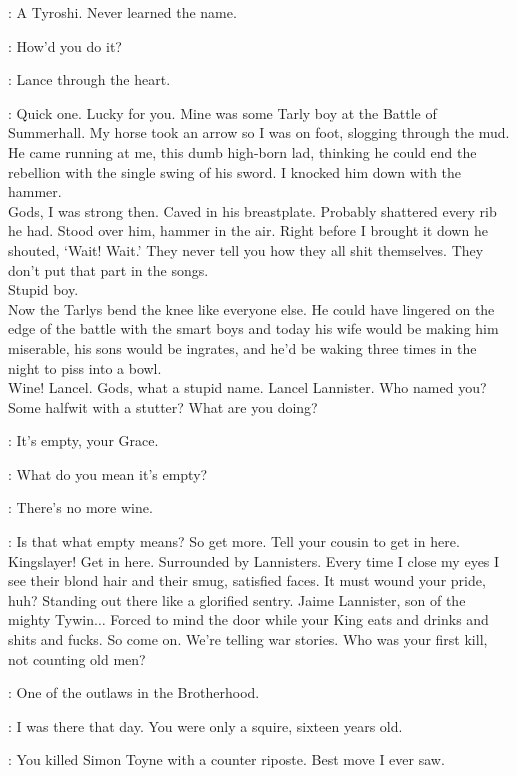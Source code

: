 \SELMY: A Tyroshi. Never learned the name. 

\ROBERT: How'd you do it? 

\SELMY: Lance through the heart. 

\ROBERT: Quick one. Lucky for you. Mine was some Tarly boy at the Battle of Summerhall. My horse took an arrow so I was on foot, slogging through the mud. He came running at me, this dumb high-born lad, thinking he could end the rebellion with the single swing of his sword. I knocked him down with the hammer.\\
Gods, I was strong then. Caved in his breastplate. Probably shattered every rib he had. Stood over him, hammer in the air. Right before I brought it down he shouted, `Wait! Wait.' They never tell you how they all shit themselves. They don't put that part in the songs.\\
Stupid boy.\\
Now the Tarlys bend the knee like everyone else. He could have lingered on the edge of the battle with the smart boys and today his wife would be making him miserable, his sons would be ingrates, and he'd be waking three times in the night to piss into a bowl.\\
Wine!  Lancel. Gods, what a stupid name. Lancel Lannister. Who named you? Some halfwit with a stutter? What are you doing? 

\LANCEL: It's empty, your Grace. 

\ROBERT: What do you mean it's empty? 

\LANCEL: There's no more wine. 

\ROBERT: Is that what empty means? So get more.  Tell your cousin to get in here. Kingslayer! Get in here.  Surrounded by Lannisters. Every time I close my eyes I see their blond hair and their smug, satisfied faces. It must wound your pride, huh? Standing out there like a glorified sentry. Jaime Lannister, son of the mighty Tywin$\ldots$ Forced to mind the door while your King eats and drinks and shits and fucks. So come on. We're telling war stories. Who was your first kill, not counting old men? 

\JAIME: One of the outlaws in the Brotherhood. 

\SELMY: I was there that day. You were only a squire, sixteen years old. 

\JAIME: You killed Simon Toyne with a counter riposte. Best move I ever saw. 

